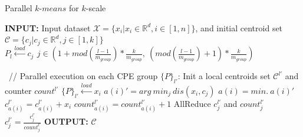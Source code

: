 \documentclass[10pt,journal,compsoc]{IEEEtran}
\begin{document}
\begin{algorithm}
\caption{Parallel $k$-$means$ for $k$-scale}
\label{alg:2}
\begin{algorithmic}[1]%
\STATE \textbf{INPUT:} Input dataset $\mathcal{X} = \{x_i | x_i\in\mathds{R}^d, i\in[1, n]\}$, and initial centroid set $\mathcal{C} = \{c_j | c_j\in\mathds{R}^d, j\in[1,k]\}$
\STATE $P_{l}\xleftarrow{load}{c_j}\,\ j \in (1+mod(\frac{l-1}{m_{group}})*\frac{k}{m_{group}},\ (mod(\frac{l-1}{m_{group}})+1)*\frac{k}{m_{group}})$
\REPEAT

\STATE \ // Parallel execution on each CPE group $\{P\}_{l'}$:
\STATE Init a local centroids set $\mathcal{C}^{l'}$ and counter $count^{l'}$
\STATE $\{P\}_{l'} \xleftarrow{load} x_i$ %
\STATE $a(i)' = arg\ min_j\ dis(x_i, c_j)$
\STATE $a(i)  = min.\ a(i)'$
\STATE $c_{a(i)}^{l'} = c_{a(i)}^{l'} + x_i$
\STATE $count_{a(i)}^{l'} =count_{a(i)}^{l'}+1$
\ENDFOR
\STATE AllReduce $c_j^{l'}$ and $count_j^{l'}$
\STATE $c_j^{l'} =  \frac{c_j^{l'}}{count_j^{l'}}$
\ENDFOR
\ENDFOR
{}
\STATE \textbf{OUTPUT:} $\mathcal{C}$
\end{algorithmic}
\end{algorithm}
\end{document}
